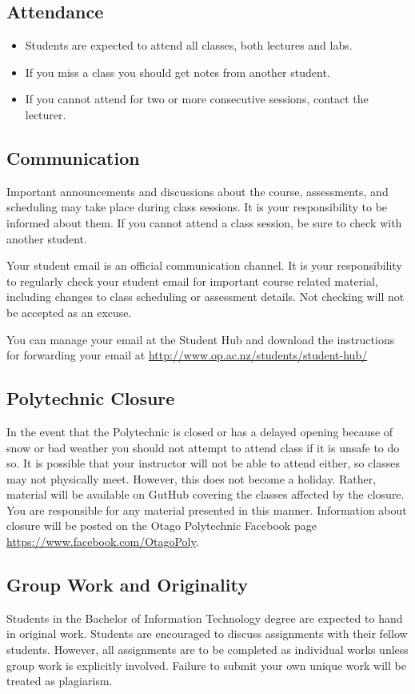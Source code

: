 \documentclass{article}
\begin{document}
\subsection*{Attendance}
\begin{itemize}
 \item Students are expected to attend all classes, both lectures and labs.
 \item If you miss a class you should get notes from another student.
 \item If you cannot attend for two or more consecutive sessions, contact the lecturer.
\end{itemize}

\subsection*{Communication}
Important announcements and discussions about the course, assessments, and scheduling may take place during class sessions.  It is your responsibility to be informed about them.  If you cannot attend a class session, be sure to check with another student.

Your student email is an official communication channel. It is your responsibility to regularly check your student email for important course related material, including changes to class scheduling or assessment details. Not checking will not be accepted as an excuse.

You can manage your email at the Student Hub and download the instructions for forwarding your email at \url{http://www.op.ac.nz/students/student-hub/}

\subsection*{Polytechnic Closure}
In the event that the Polytechnic is closed or has a delayed opening because of snow or bad weather you should not attempt to attend class if it is unsafe to do so. It is possible that your instructor will not be able to attend either, so classes may not physically meet. However, this does not become a holiday. Rather, material will be available on GutHub covering the classes affected by the closure. You are responsible for any material presented in this manner. Information about closure will be posted on the Otago Polytechnic Facebook page \url{https://www.facebook.com/OtagoPoly}.

\subsection*{Group Work and Originality}
Students in the Bachelor of Information Technology degree are expected to hand in original work.  Students are encouraged to discuss
assignments with their fellow students.  However, all assignments are to be completed as individual works unless group work is explicitly involved.
Failure to submit your own unique work will be treated as plagiarism.
\end{document}
